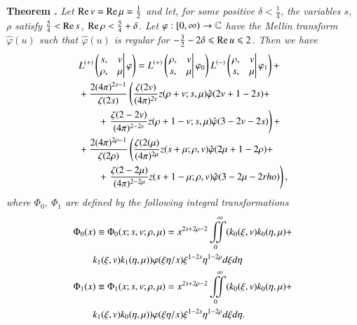 \medskip
\noindent
{\bfseries Theorem .\label{art7-thm14}}
\textit{Let $\operatorname{Re} v = \operatorname{Re} \mu =\frac{1}{2}$ and let, for some positive $\delta < \frac{1}{4}$, the variables $s$, $\rho$ satisfy $\frac{5}{4} < \operatorname{Re} s$, $\operatorname{Re} \rho < \frac{5}{4} + \delta$. Let $\varphi : [0, \infty) \to \mathbb{C}$ have the Mellin transform $\hat{\varphi} (u)$ such that $\hat{\varphi} (u)$ is regular for $-\frac{3}{2} - 2 \delta \leqslant \operatorname{Re} u \leqslant 2$. Then we have}
\begin{align}
&L^{(+)}
\left( 
\left. 
\begin{matrix}
s, & v\\
\rho , & \mu
\end{matrix}
\right| \varphi 
\right) = L^{(+)}
\left( 
\left. 
\begin{matrix}
\rho, & v\\
s, & \mu
\end{matrix}
\right| \varphi_0
\right) L^{(-)}
\left( 
\left. 
\begin{matrix}
\rho, & v\\
s, & \mu
\end{matrix}
\right| \varphi_1
\right) +\label{art7-eq3.11}\\
&+ \frac{2(4\pi)^{2s-1}}{\zeta(2s)} \left(\frac{\zeta (2v)}{(4\pi)^{2v}} z(\rho + v; s, \mu) \hat{\varphi} (2v+ 1 - 2 s) +  \right. \notag\\
& \qquad +\left. \frac{\zeta(2-2v)}{(4\pi)^{2-2v}} z (\rho + 1 - v ; s, \mu) \hat{\varphi} (3-2v-2s) \right)+ \notag\\
& + \frac{2(4\pi)^{2\rho-1}}{\zeta(2\rho)} \left(\frac{\zeta (2(\mu)}{(4\pi)^{2\mu}} z (s+\mu; \rho, v) \hat{\varphi}  (2\mu + 1 - 2 \rho) + \right. \notag\\
& \qquad + \left. \frac{\zeta (2-2\mu)}{(4\pi)^{2-2\mu}} z (s+1-\mu; \rho, v) \hat{\varphi} (3-2\mu -2 rho)\right), \notag
\end{align}
\textit{where $\Phi_0$, $\Phi_1$ are defined by the following integral transformations}
\begin{align}
&\Phi_0 (x) \equiv \Phi_0 (x; s, v; \rho, \mu) = x^{2s+2\rho-2} \iint\limits^\infty_0 (k_0 (\xi, v) k_0 (\eta, \mu) + \label{art7-eq3.12}\\
& \qquad k_1 (\xi, v) k_1 (\eta, \mu)) \varphi (\xi \eta / x) \xi^{1-2s} \eta^{1-2\rho} d \xi d \eta \notag\\
& \Phi_1 (x) \equiv \Phi_1 (x; s , v; \rho, \mu) = x^{2s+ 2\rho -2} \iint\limits^{\infty}_0 (k_0 (\xi, v)k_0 (\eta, \mu) + \label{art7-eq3.13}\\
& \qquad k_1 (\xi, v) k_0 (\eta, \mu)) \varphi  (\xi \eta / x) \xi^{1-2s} \eta^{1-2\rho} d \xi d \eta.  \notag
\end{align}

